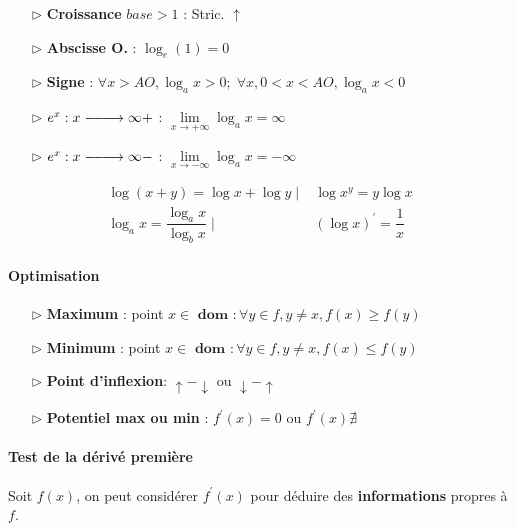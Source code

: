 \documentclass[2pt]{report}
\DeclareRobustCommand{\looongrightarrow}{%
  \DOTSB\relbar\joinrel\relbar\joinrel\relbar\joinrel\rightarrow
}
\begin{document}
\begin{multicols*}{3}
\begin{itemize}
        \item[$\rhd$]  \textbf{Croissance}  $base > 1$ : Stric. $\uparrow$
        \item[$\rhd$]  \textbf{Abscisse O.} : $\log_e(1) = 0$ 
        \item[$\rhd$]  \textbf{Signe} : $\forall x > AO, \log_ax > 0; \; 
            \forall x, 0 < x < AO, \log_ax < 0$  
        \item[$\rhd$]   $e^x : x\looongrightarrow\infty+$ :  
            $\lim\limits_{x\to+\infty}\log_ax  = \infty$  
            \item[$\rhd$]   $e^x : x\looongrightarrow\infty-$ :  
                $\lim\limits_{x\to-\infty}\log_ax  = -\infty$
    \end{itemize}



    \begin{align*}
      \log(x+y) = \log x + \log y \; \Big| & \; \log x^y = y\log x \\
      \log_a x = \dfrac{\log_a x}{\log_b x} \; \Big| & \; 
                                     (\log x)^{\prime} = \dfrac{1}{x}  
    \end{align*}

    \paragraph{Optimisation}

    \begin{itemize}
        \item[$\rhd$]  \textbf{Maximum} : point $x \in \textbf{ dom } : 
            \forall y \in f, y \neq x, f(x) \geq f(y)$     
        \item[$\rhd$]  \textbf{Minimum} : point $x \in \textbf{ dom } : 
            \forall y \in f, y \neq x, f(x) \leq f(y)$    
        \item[$\rhd$]  \textbf{Point d'inflexion}: $\uparrow - \downarrow$ 
            ou $\downarrow - \uparrow$
        \item[$\rhd$]  \textbf{Potentiel max ou min} :   
        $f^{\prime} \left( x \right) = 0$ ou 
        $f^{\prime} \left(x\right) \nexists$
    \end{itemize}

    \paragraph{Test de la dérivé première}
    Soit $f\left(x\right)$, on peut considérer $f^{\prime}(x)$ 
    pour déduire des \textbf{informations} propres à $f$.   


\end{multicols*}
\end{document}
